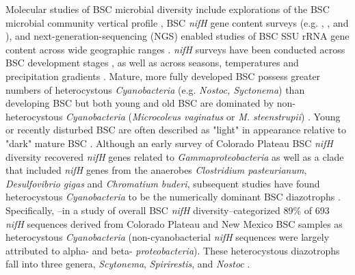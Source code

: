 Molecular studies of BSC microbial diversity include explorations of the BSC
microbial community vertical profile \citep{Garcia_Pichel_2003}, BSC
\textit{nifH} gene content surveys (e.g. \citet{14766579}, \citet{Yeager_2012},
\citet{Yeager} and \citet{Steppe_1996}), and next-generation-sequencing (NGS)
enabled studies of BSC SSU rRNA gene content across wide geographic ranges
\citep{Garcia_Pichel_2013, Steven_2013}. 
\textit{nifH} surveys have been conducted across BSC development stages
\citep{14766579}, as well as across seasons, temperatures and precipitation
gradients \citep{Yeager_2012}. Mature, more fully developed BSC possess greater
numbers of heterocystous \textit{Cyanobacteria} (e.g. \textit{Nostoc,
Syctonema}) than developing BSC but both young and old BSC are dominated by
non-heterocystous \textit{Cyanobacteria} (\textit{Microcoleus vaginatus} or
\textit{M. steenstrupii}) \citep{14766579, Garcia_Pichel_2013}. Young or
recently disturbed BSC are often described as "light" in appearance relative to
"dark" mature BSC \citep{Belnap_2002, 14766579}.  Although an early survey of
Colorado Plateau BSC \textit{nifH} diversity recovered \textit{nifH} genes
related to \textit{Gammaproteobacteria} as well as a clade that included
\textit{nifH} genes from the anaerobes \textit{Clostridium pasteurianum},
\textit{Desulfovibrio gigas} and \textit{Chromatium buderi}, subsequent studies
have found heterocystous \textit{Cyanobacteria} to be the numerically dominant
BSC diazotrophs \citep{Yeager, 14766579, Yeager_2012}. Specifically,
\citet{Yeager}--in a study of overall BSC \textit{nifH} diversity--categorized
89\% of 693 \textit{nifH} sequences derived from Colorado Plateau and New
Mexico BSC samples as heterocystous \textit{Cyanobacteria} (non-cyanobacterial
\textit{nifH} sequences were largely attributed to alpha- and beta-
\textit{proteobacteria}). These heterocystous diazotrophs fall
into three genera, \textit{Scytonema}, \textit{Spirirestis}, and
\textit{Nostoc} \citep{Yeager, Yeager_2012}. 

